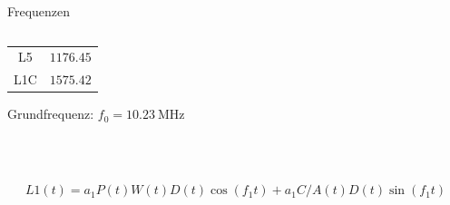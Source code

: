 \begin{frame}{Frequenzen}
\begin{columns}
\begin{column}{0.5\textwidth}
\begin{table}
\begin{tabular}{c c}
                    L5      & $\num{1176.45}$ \\
                    L1C     & $\num{1575.42}$ \\
                    \bottomrule
                \end{tabular}
            \end{table}
            Grundfrequenz: $f_0 = \SI{10.23}{\mega\hertz}$
        \end{column}
    \end{columns}
    ~\\~\\
    \begin{equation}
        L1(t) = a_1P(t)W(t)D(t)\cos(f_1t)+a_1C/A(t)D(t)\sin(f_1t)
    \end{equation}
\end{frame}

